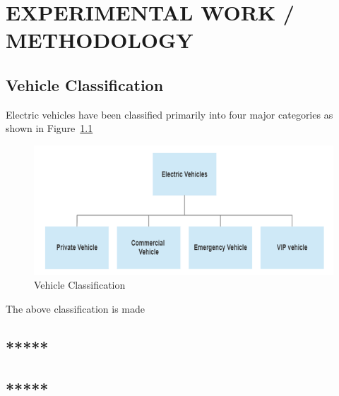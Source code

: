 	\chapter{EXPERIMENTAL WORK / METHODOLOGY}
	\label{chap:work}
	
	\section{Vehicle Classification}
	
	 Electric vehicles have been classified primarily into four major categories as shown in Figure~\ref{fig:classification} 
	 	
			\begin{figure}[h]
				\centering
				\includegraphics[width=0.7\linewidth]{classification}
				\caption{Vehicle Classification}
				\label{fig:classification}
			\end{figure}
	The above classification is made

	
	
	\section{*****}
	\section{*****}